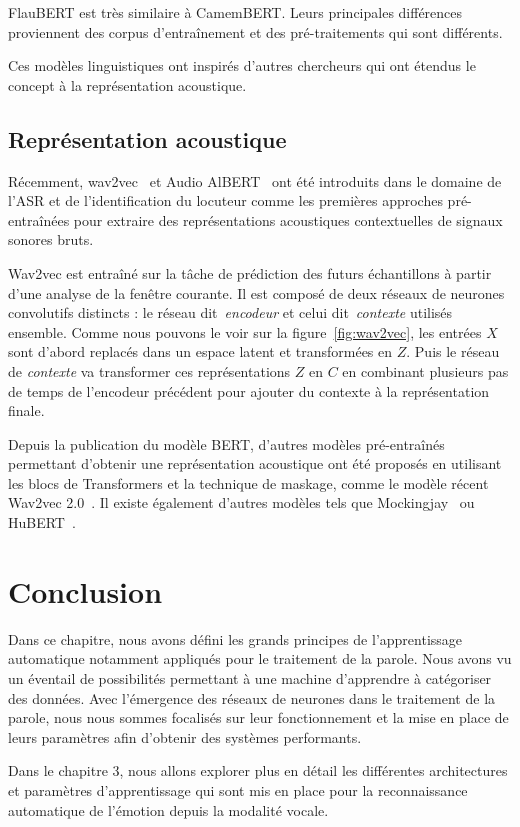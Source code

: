 FlauBERT est très similaire à CamemBERT. Leurs principales différences proviennent des corpus d’entraînement et des pré-traitements qui sont différents. %

Ces modèles linguistiques ont inspirés d'autres chercheurs qui ont étendus le concept à la représentation acoustique.

\subsection{Représentation acoustique}
Récemment, wav2vec~\cite{Schneider2019} et Audio AlBERT~\cite{Chi2020} ont été introduits dans le domaine de l'ASR et de l'identification du locuteur comme les premières approches pré-entraînées pour extraire des représentations acoustiques contextuelles de signaux sonores bruts.



Wav2vec est entraîné sur la tâche de prédiction des futurs échantillons à partir d'une analyse de la fenêtre courante. Il est composé de deux réseaux de neurones convolutifs distincts : le réseau dit~\textit{encodeur} et celui dit~\textit{contexte} utilisés ensemble. Comme nous pouvons le voir sur la figure~\ref{fig:wav2vec}, les entrées $X$ sont d'abord replacés dans un espace latent et transformées en $Z$. Puis le réseau de \textit{contexte} va transformer ces représentations $Z$ en $C$ en combinant plusieurs pas de temps de l'encodeur précédent pour ajouter du contexte à la représentation finale.

Depuis la publication du modèle BERT, d'autres modèles pré-entraînés permettant d'obtenir une représentation acoustique ont été proposés en utilisant les blocs de Transformers et la technique de maskage, comme le modèle récent Wav2vec 2.0~\cite{Baevski2020}.
Il existe également d'autres modèles tels que Mockingjay~\cite{Liu2020} ou HuBERT~\cite{Hsu2021}.

\section{Conclusion}
Dans ce chapitre, nous avons défini les grands principes de l'apprentissage automatique notamment appliqués pour le traitement de la parole. Nous avons vu un éventail de possibilités permettant à une machine d'apprendre à catégoriser des données. Avec l'émergence des réseaux de neurones dans le traitement de la parole, nous nous sommes focalisés sur leur fonctionnement et la mise en place de leurs paramètres afin d'obtenir des systèmes performants.

Dans le chapitre 3, nous allons explorer plus en détail les différentes architectures et paramètres d'apprentissage qui sont mis en place pour la reconnaissance automatique de l'émotion depuis la modalité vocale.
